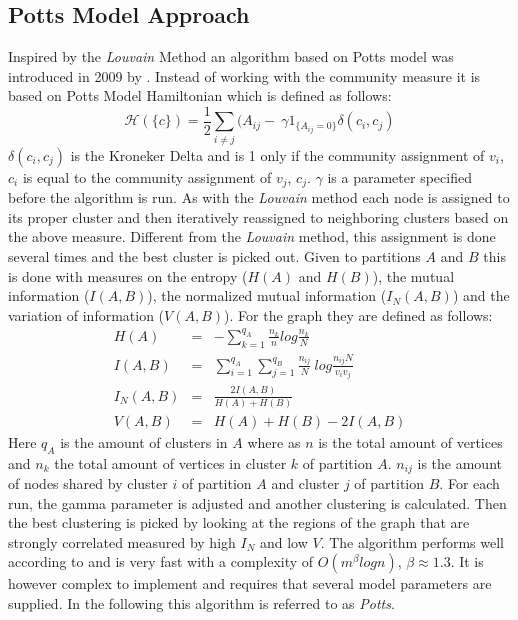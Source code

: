 \subsection{Potts Model Approach}
Inspired by the \emph{Louvain} Method an algorithm based on Potts model 
was introduced in 2009 by \cite{ronhovde2009}. Instead of working with 
the community measure it is based on Potts Model Hamiltonian which is 
defined as follows:
\begin{equation}
	\mathcal{H}(\{c\}) = \frac{1}{2} \sum_{i \neq j} (A_{ij} - \
	\gamma \mathcal{1}_{\{A_{ij} = 0\}} \delta(c_i, c_j)
\end{equation}
$\delta(c_i, c_j)$ is the Kroneker Delta and is 1 only if the community 
assignment of $v_i$, $c_i$ is equal to the community assignment of 
$v_j$, $c_j$. $\gamma$ is a parameter specified before the algorithm is 
run. As with the \emph{Louvain} method each node is assigned to its 
proper cluster and then iteratively reassigned to neighboring clusters 
based on the above measure. Different from the \emph{Louvain} method, 
this assignment is done several times and the best cluster is picked 
out.  Given to partitions $A$ and $B$ this is done with measures on the 
entropy ($H(A)$ and $H(B)$), the mutual information ($I(A,B)$), the 
normalized mutual information ($I_N(A,B)$) and the variation of 
information ($V(A,B)$).  For the graph they are defined as follows:
\begin{eqnarray}
	H(A) & = & - \sum_{k=1}^{q_A} \frac{n_k}{n} log \frac{n_k}{N} \\
	I(A,B) & = & \sum_{i=1}^{q_A} \sum_{j=1}^{q_B} \frac{n_{ij}}{N} \
	log \frac{n_{ij}N}{v_i v_j} \\
	I_N(A,B) & = & \frac{2I(A,B)}{H(A) + H(B)} \\
	V(A,B) & = & H(A) + H(B) - 2I(A,B)
\end{eqnarray}
Here $q_A$ is the amount of clusters in $A$ where as $n$ is the total 
amount of vertices and $n_k$ the total amount of vertices in cluster $k$ 
of partition $A$. $n_{ij}$ is the amount of nodes shared by cluster $i$ 
of partition $A$ and cluster $j$ of partition $B$. For each run, the 
gamma parameter is adjusted and another clustering is calculated. Then 
the best clustering is picked by looking at the regions of the graph 
that are strongly correlated measured by high $I_N$ and low $V$.
The algorithm performs well according to \cite{lancichinetti2009} and is 
very fast with a complexity of $O(m^\beta log n)$, $\beta \approx 1.3$.  
It is however complex to implement and requires that several model 
parameters are supplied. In the following this algorithm is referred to 
as \emph{Potts}.

